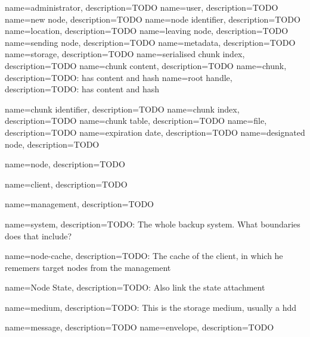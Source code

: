 {
	name={administrator},
	description={TODO}
}
{
	name={user},
	description={TODO}
}
{
	name={new node},
	description={TODO}
}
{
	name={node identifier},
	description={TODO}
}
{
	name={location},
	description={TODO}
}
{
	name={leaving node},
	description={TODO}
}
{
	name={sending node},
	description={TODO}
}
{
	name={metadata},
	description={TODO}
}
{
	name={storage},
	description={TODO}
}
{
	name={serialised chunk index},
	description={TODO}
}
{
	name={chunk content},
	description={TODO}
}
{
	name={chunk},
	description={TODO: has content and hash}
}
{
	name={root handle},
	description={TODO: has content and hash}
}

{
	name={chunk identifier},
	description={TODO}
}
{
	name={chunk index},
	description={TODO}
}
{
	name={chunk table},
	description={TODO}
}
{
	name={file},
	description={TODO}
}
{
	name={expiration date},
	description={TODO}
}
{
	name={designated node},
	description={TODO}
}

{
	name={node},
	description={TODO}
}

{
	name={client},
	description={TODO}
}

{
	name={management},
	description={TODO}
}

{
    name={system},
    description={TODO: The whole backup system. What boundaries does that include?}
}

{
    name={node-cache},
    description={TODO: The cache of the client, in which he rememers target nodes from the management}
}

{
    name={Node State},
    description={TODO: Also link the state attachment}
}

{
    name={medium},
    description={TODO: This is the storage medium, usually a hdd}
}

{
    name={message},
    description={TODO}
}
{
    name={envelope},
    description={TODO}
}